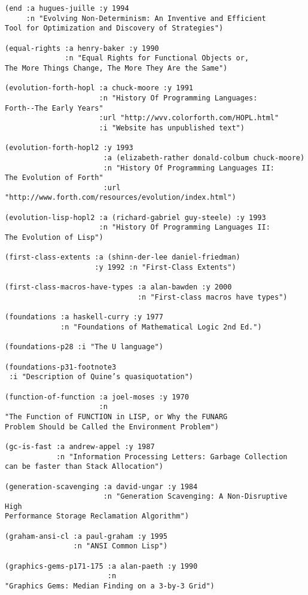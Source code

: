 \begin{verbatim}
(end :a hugues-juille :y 1994
     :n "Evolving Non-Determinism: An Inventive and Efficient
Tool for Optimization and Discovery of Strategies")

(equal-rights :a henry-baker :y 1990
              :n "Equal Rights for Functional Objects or,
The More Things Change, The More They Are the Same")

(evolution-forth-hopl :a chuck-moore :y 1991
                      :n "History Of Programming Languages:
Forth--The Early Years"
                      :url "http://wvv.colorforth.com/HOPL.html"
                      :i "Website has unpublished text")

(evolution-forth-hopl2 :y 1993
                       :a (elizabeth-rather donald-colbum chuck-moore)
                       :n "History Of Programming Languages II:
The Evolution of Forth"
                       :url
"http://www.forth.com/resources/evolution/index.html")

(evolution-lisp-hopl2 :a (richard-gabriel guy-steele) :y 1993
                      :n "History Of Programming Languages II:
The Evolution of Lisp")

(first-class-extents :a (shinn-der-lee daniel-friedman)
                     :y 1992 :n "First-Class Extents")

(first-class-macros-have-types :a alan-bawden :y 2000
                               :n "First-class macros have types")

(foundations :a haskell-curry :y 1977
             :n "Foundations of Mathematical Logic 2nd Ed.")

(foundations-p28 :i "The U language")

(foundations-p31-footnote3
 :i "Description of Quine’s quasiquotation")

(function-of-function :a joel-moses :y 1970
                      :n
"The Function of FUNCTION in LISP, or Why the FUNARG
Problem Should be Called the Environment Problem")

(gc-is-fast :a andrew-appel :y 1987
            :n "Information Processing Letters: Garbage Collection
can be faster than Stack Allocation")

(generation-scavenging :a david-ungar :y 1984
                       :n "Generation Scavenging: A Non-Disruptive High
Performance Storage Reclamation Algorithm")

(graham-ansi-cl :a paul-graham :y 1995
                :n "ANSI Common Lisp")

(graphics-gems-p171-175 :a alan-paeth :y 1990
                        :n
"Graphics Gems: Median Finding on a 3-by-3 Grid")


\end{verbatim}

